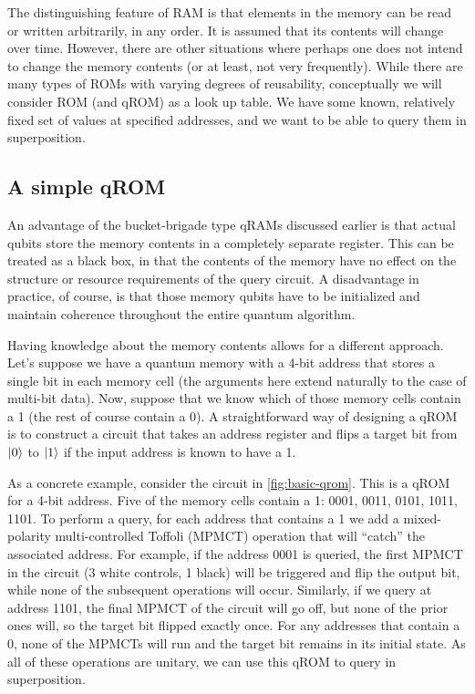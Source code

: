 \documentclass[a4paper,12pt]{article}
\begin{document}
The distinguishing feature of RAM is that elements in the memory can be read or written arbitrarily, in any order. 
It is assumed that its contents will change over time. 
However, there are other situations where perhaps one does not intend to change the memory contents (or at least, not very frequently). 
While there are many types of ROMs with varying degrees of reusability, conceptually we will consider ROM (and qROM) as a look up table. 
We have some known, relatively fixed set of values at specified addresses, and we want to be able to query them in superposition.

\subsection{A simple qROM}
\label{subsec:naive-qrom}

An advantage of the bucket-brigade type qRAMs discussed earlier is that actual qubits store the memory contents in a completely separate register. This can be treated as a black box, in that the contents of the memory have no effect on the structure or resource requirements of the query circuit. A disadvantage in practice, of course, is that those memory qubits have to be initialized and maintain coherence throughout the entire quantum algorithm.

Having knowledge about the memory contents allows for a different approach. Let's suppose we have a quantum memory with a 4-bit address that stores a single bit in each memory cell (the arguments here extend naturally to the case of multi-bit data). Now, suppose that we know which of those memory cells contain a 1 (the rest of course contain a 0). A straightforward way of designing a qROM is to construct a circuit that takes an address register and flips a target bit from $\ket{0}$ to $\ket{1}$ if the input address is known to have a 1.

As a concrete example, consider the circuit in \autoref{fig:basic-qrom}. This is a qROM for a 4-bit address. Five of the memory cells contain a 1: 0001, 0011, 0101, 1011, 1101. To perform a query, for each address that contains a 1 we add a mixed-polarity multi-controlled Toffoli (MPMCT) operation that will ``catch'' the associated address. For example, if the address 0001 is queried, the first MPMCT in the circuit (3 white controls, 1 black) will be triggered and flip the output bit, while none of the subsequent operations will occur. Similarly, if we query at address 1101, the final MPMCT of the circuit will go off, but none of the prior ones will, so the target bit flipped exactly once. For any addresses that contain a 0, none of the MPMCTs will run and the target bit remains in its initial state. As all of these operations are unitary, we can use this qROM to query in superposition. 
\end{document}
